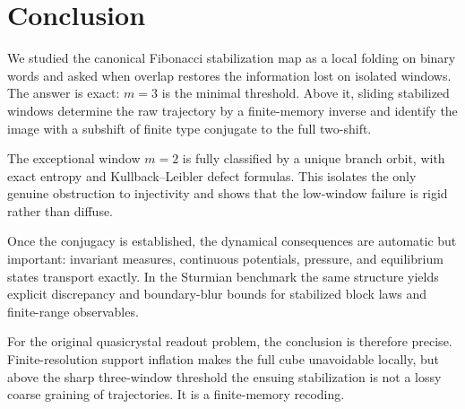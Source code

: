 \section{Conclusion}\label{sec:conclusion}

We studied the canonical Fibonacci stabilization map as a local folding on binary words and asked when overlap restores the information lost on isolated windows. The answer is exact: $m=3$ is the minimal threshold. Above it, sliding stabilized windows determine the raw trajectory by a finite-memory inverse and identify the image with a subshift of finite type conjugate to the full two-shift.

The exceptional window $m=2$ is fully classified by a unique branch orbit, with exact entropy and Kullback--Leibler defect formulas. This isolates the only genuine obstruction to injectivity and shows that the low-window failure is rigid rather than diffuse.

Once the conjugacy is established, the dynamical consequences are automatic but important: invariant measures, continuous potentials, pressure, and equilibrium states transport exactly. In the Sturmian benchmark the same structure yields explicit discrepancy and boundary-blur bounds for stabilized block laws and finite-range observables.

For the original quasicrystal readout problem, the conclusion is therefore precise. Finite-resolution support inflation makes the full cube unavoidable locally, but above the sharp three-window threshold the ensuing stabilization is not a lossy coarse graining of trajectories. It is a finite-memory recoding.
